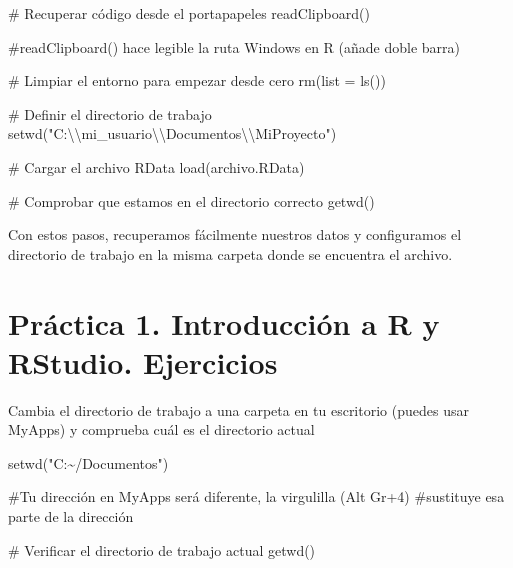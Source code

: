 \documentclass[
  letterpaper,
  DIV=11,
  numbers=noendperiod]{scrreprt}
\newenvironment{Shaded}{\begin{snugshade}}{\end{snugshade}}
\newcommand{\AttributeTok}[1]{\textcolor[rgb]{0.40,0.45,0.13}{#1}}
\newcommand{\CommentTok}[1]{\textcolor[rgb]{0.37,0.37,0.37}{#1}}
\newcommand{\FunctionTok}[1]{\textcolor[rgb]{0.28,0.35,0.67}{#1}}
\newcommand{\NormalTok}[1]{\textcolor[rgb]{0.00,0.23,0.31}{#1}}
\newcommand{\SpecialCharTok}[1]{\textcolor[rgb]{0.37,0.37,0.37}{#1}}
\newcommand{\StringTok}[1]{\textcolor[rgb]{0.13,0.47,0.30}{#1}}
\begin{document}
\begin{Shaded}
\begin{Highlighting}[]
\CommentTok{\# Recuperar código desde el portapapeles}
\FunctionTok{readClipboard}\NormalTok{()}

\CommentTok{\#readClipboard() hace legible la ruta Windows en R (añade doble barra)}

\CommentTok{\# Limpiar el entorno para empezar desde cero}
\FunctionTok{rm}\NormalTok{(}\AttributeTok{list =} \FunctionTok{ls}\NormalTok{())}

\CommentTok{\# Definir el directorio de trabajo}
\FunctionTok{setwd}\NormalTok{(}\StringTok{"C:}\SpecialCharTok{\textbackslash{}\textbackslash{}}\StringTok{mi\_usuario}\SpecialCharTok{\textbackslash{}\textbackslash{}}\StringTok{Documentos}\SpecialCharTok{\textbackslash{}\textbackslash{}}\StringTok{MiProyecto"}\NormalTok{)}

\CommentTok{\# Cargar el archivo RData}
\FunctionTok{load}\NormalTok{(archivo.RData)}

\CommentTok{\# Comprobar que estamos en el directorio correcto}
\FunctionTok{getwd}\NormalTok{()}
\end{Highlighting}
\end{Shaded}

Con estos pasos, recuperamos fácilmente nuestros datos y configuramos el
directorio de trabajo en la misma carpeta donde se encuentra el archivo.

\hypertarget{pruxe1ctica-1.-introducciuxf3n-a-r-y-rstudio.-ejercicios}{%
\chapter{\texorpdfstring{{Práctica 1. Introducción a R y RStudio.
Ejercicios}}{Práctica 1. Introducción a R y RStudio. Ejercicios}}\label{pruxe1ctica-1.-introducciuxf3n-a-r-y-rstudio.-ejercicios}}

Cambia el directorio de trabajo a una carpeta en tu escritorio (puedes
usar MyApps) y comprueba cuál es el directorio actual

\begin{Shaded}
\begin{Highlighting}[]
\FunctionTok{setwd}\NormalTok{(}\StringTok{"C:\textasciitilde{}/Documentos"}\NormalTok{)}

\CommentTok{\#Tu dirección en MyApps será diferente, la virgulilla (Alt Gr+4) }
\CommentTok{\#sustituye esa parte de la dirección}

\CommentTok{\# Verificar el directorio de trabajo actual}
\FunctionTok{getwd}\NormalTok{()}
\end{Highlighting}
\end{Shaded}
\end{document}
